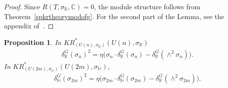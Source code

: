 \documentclass[pdftex]{sigma}
\numberwithin{equation}{section}
\newtheorem{Proposition}[Theorem]{Proposition}
{\theoremstyle{definition}
\newtheorem{Definition}[Theorem]{Definition}
\newtheorem{Example}[Theorem]{Example}
\newtheorem{Remark}[Theorem]{Remark}
}
\begin{document}
\begin{proof}
Since $R(T,
\sigma_\mathbb{R}, \mathbb{C})=0$, the module structure follows from Theorem~\ref{spkrtheorymodofg}.
For the second part of the Lemma, see the appendix of~\cite{Se}.
\end{proof}
\begin{Proposition}
\label{equivkrthysquaresigma}
In $KR^*_{(U(n),
\sigma_\mathbb{R})}(U(n),
\sigma_\mathbb{R})$
\begin{gather}
\label{realsigmasquare}
\delta_\mathbb{R}^G(\sigma_n)^2
=\eta\big(\sigma_n\cdot\delta_\mathbb{R}^G(\sigma_n)-\delta_\mathbb{R}^G(\wedge^2\sigma_n)\big).
\end{gather}
In $KR^*_{(U(2m),
\sigma_\mathbb{H})}(U(2m),
\sigma_\mathbb{H})$,
\begin{gather}
\label{quatsigmasquare}
\delta_\mathbb{H}^G(\sigma_{2m})^2=\eta\big(\sigma_{2m}
\cdot\delta_\mathbb{H}^G(\sigma_{2m})-\delta_\mathbb{R}^G(\wedge^2\sigma_{2m})\big).
\end{gather}
\end{Proposition}
\end{document}
